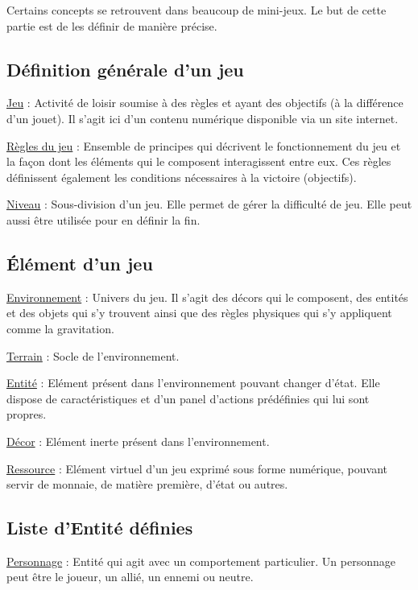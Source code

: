 Certains concepts se retrouvent dans beaucoup de mini-jeux. Le but de cette partie est de les définir de manière précise.

\subsection*{Définition générale d'un jeu}

\underline{Jeu} : 
Activité de loisir soumise à des règles et ayant des objectifs (à la différence d'un jouet). Il s'agit ici d'un contenu numérique
 disponible via un site internet.

\underline{Règles du jeu} : 
Ensemble de principes qui décrivent le fonctionnement du jeu et 
la façon dont les éléments qui le composent interagissent entre eux. 
Ces règles définissent également les conditions nécessaires à la victoire (objectifs).

\underline{Niveau} :
Sous-division d'un jeu. Elle permet de gérer la difficulté de jeu. Elle peut aussi être utilisée pour en définir la fin. 

\subsection*{Élément d'un jeu}

\underline{Environnement} : 
Univers du jeu. Il s'agit des décors qui le composent, des entités et des objets qui s'y trouvent ainsi que 
des règles physiques qui s'y appliquent comme la gravitation.

\underline{Terrain} : 
Socle de l'environnement.

\underline{Entité} : 
Elément présent dans l'environnement pouvant changer d'état. 
Elle dispose de caractéristiques et d'un panel d'actions prédéfinies qui lui sont propres.

\underline{Décor} : 
Elément inerte présent dans l'environnement.

\underline{Ressource} : 
Elément virtuel d'un jeu exprimé sous forme numérique, pouvant servir de monnaie, de matière première, d'état ou autres.

\subsection*{Liste d'Entité définies}

\underline{Personnage} :
Entité qui agit avec un comportement particulier. Un personnage peut être le joueur, un allié, un ennemi ou neutre.

